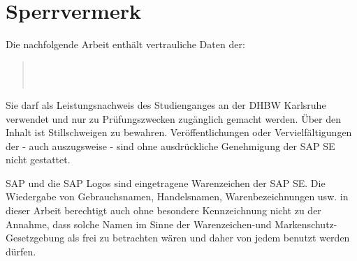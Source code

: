\chapter*{Sperrvermerk}
Die nachfolgende Arbeit enthält vertrauliche Daten der:
\begin{quote}
	\firmaName \\
	\firmaStrasse \\
	\firmaPlz
\end{quote}

\vspace{0.5cm}

Sie darf als Leistungsnachweis des Studienganges \studiengang{} \studienjahr{} an der DHBW Karlsruhe verwendet und nur zu Prüfungszwecken zugänglich gemacht werden. Über den Inhalt ist Stillschweigen zu bewahren. Veröffentlichungen oder Vervielfältigungen der \arbeit{} - auch auszugsweise - sind ohne ausdrückliche Genehmigung der SAP SE nicht gestattet.

\vspace{0.5cm}

SAP und die SAP Logos sind eingetragene Warenzeichen der SAP SE. Die Wiedergabe von Gebrauchsnamen, Handelsnamen, Warenbezeichnungen usw. in dieser Arbeit berechtigt auch ohne besondere Kennzeichnung nicht zu der Annahme, dass solche Namen im Sinne der Warenzeichen-und Markenschutz-Gesetzgebung als frei zu betrachten wären und daher von jedem benutzt werden dürfen.